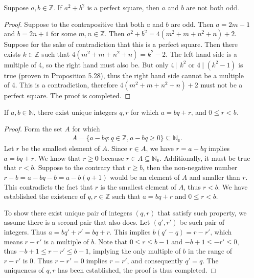\documentclass{exam}
\begin{document}
\begin{proposition}{7.27}
    Suppose $a,b\in\mathbb Z$. If $a^2+b^2$ is a perfect square, then $a$ and $b$ are not both odd.
\end{proposition}

\begin{proof}
    Suppose to the contrapositive that both $a$ and $b$ are odd. Then $a = 2m+1$ and $b = 2n + 1$ for some $m,n\in\mathbb Z$. Then $a^2 + b^2 = 4(m^2+m+n^2+n) + 2$. Suppose for the sake of contradiction that this is a perfect square. Then there exists $k\in\mathbb Z$ such that $4(m^2 + m +n^2 + n) = k^2 - 2$. The left hand side is a multiple of 4, so the right hand must also be. But only $4\mid k^2$ or $4\mid (k^2-1)$ is true (proven in Proposition 5.28), thus the right hand side cannot be a multiple of 4. This is a contradiction, therefore $4(m^2+m+n^2+n)+2$ must not be a perfect square. The proof is completed.
\end{proof}

\begin{proposition}{7.28}
    If $a,b\in\mathbb N$, there exist unique integers $q,r$ for which $a=bq+r$, and $0\le r < b$.
\end{proposition}

\begin{proof}
    Form the set $A$ for which
    \begin{align*}
        A = \{a - bq: q\in\mathbb Z, a-bq \ge 0\}\subseteq\mathbb N_0.
    \end{align*}
    Let $r$ be the smallest element of $A$. Since $r\in A$, we have $r = a - bq$ implies $a = bq + r$. We know that $r\ge0$ because $r\in A\subseteq \mathbb N_0$. Additionally, it must be true that $r < b$. Suppose to the contrary that $r \ge b$, then the non-negative number $r-b = a-bq -b = a-b(q+1)$ would be an element of $A$ and smaller than $r$. This contradicts the fact that $r$ is the smallest element of $A$, thus $r<b$. We have established the existence of $q,r\in\mathbb Z$ such that $a = bq + r$ and $0\le r<b$.

    To show there exist unique pair of integers $(q, r)$ that satisfy such property, we assume there is a second pair that also does. Let $(q',r')$ be such pair of integers. Thus $a=bq'+r'=bq+r$. This implies $b(q'-q)=r-r'$, which means $r-r'$ is a multiple of $b$. Note that $0 \le r \le b-1$ and $-b+1 \le -r' \le 0$, thus $-b + 1\le r - r' \le b - 1$, implying the only multiple of $b$ in the range of $r-r'$ is 0. Thus $r-r'=0$ implies $r = r'$, and consequently $q' = q$. The uniqueness of $q, r$ has been established, the proof is thus completed.
\end{proof}
\end{document}
